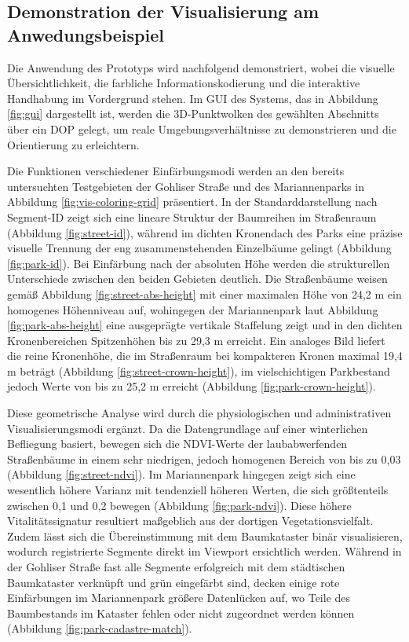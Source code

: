 \subsection{Demonstration der Visualisierung am Anwedungsbeispiel}

Die Anwendung des Prototyps wird nachfolgend demonstriert, wobei die visuelle Übersichtlichkeit, die farbliche Informationskodierung und die interaktive Handhabung im Vordergrund stehen. Im GUI des Systems, das in Abbildung \ref{fig:gui} dargestellt ist, werden die 3D-Punktwolken des gewählten Abschnitts über ein DOP gelegt, um reale Umgebungsverhältnisse zu demonstrieren und die Orientierung zu erleichtern.

Die Funktionen verschiedener Einfärbungsmodi werden an den bereits untersuchten Testgebieten der Gohliser Straße und des Mariannenparks in Abbildung \ref{fig:vis-coloring-grid} präsentiert. In der Standarddarstellung nach Segment-ID zeigt sich eine lineare Struktur der Baumreihen im Straßenraum (Abbildung \ref{fig:street-id}), während im dichten Kronendach des Parks eine präzise visuelle Trennung der eng zusammenstehenden Einzelbäume gelingt (Abbildung \ref{fig:park-id}). Bei Einfärbung nach der absoluten Höhe werden die strukturellen Unterschiede zwischen den beiden Gebieten deutlich. Die Straßenbäume weisen gemäß Abbildung \ref{fig:street-abs-height} mit einer maximalen Höhe von 24,2 m ein homogenes Höhenniveau auf, wohingegen der Mariannenpark laut Abbildung \ref{fig:park-abs-height} eine ausgeprägte vertikale Staffelung zeigt und in den dichten Kronenbereichen Spitzenhöhen bis zu 29,3 m erreicht. Ein analoges Bild liefert die reine Kronenhöhe, die im Straßenraum bei kompakteren Kronen maximal 19,4 m beträgt (Abbildung \ref{fig:street-crown-height}), im vielschichtigen Parkbestand jedoch Werte von bis zu 25,2 m erreicht (Abbildung \ref{fig:park-crown-height}).  

Diese geometrische Analyse wird durch die physiologischen und administrativen Visualisierungsmodi ergänzt. Da die Datengrundlage auf einer winterlichen Befliegung basiert, bewegen sich die NDVI-Werte der laubabwerfenden Straßenbäume in einem sehr niedrigen, jedoch homogenen Bereich von bis zu 0,03 (Abbildung \ref{fig:street-ndvi}). Im Mariannenpark hingegen zeigt sich eine wesentlich höhere Varianz mit tendenziell höheren Werten, die sich größtenteils zwischen 0,1 und 0,2 bewegen (Abbildung \ref{fig:park-ndvi}). Diese höhere Vitalitätssignatur resultiert maßgeblich aus der dortigen Vegetationsvielfalt. Zudem lässt sich die Übereinstimmung mit dem Baumkataster binär visualisieren, wodurch registrierte Segmente direkt im Viewport ersichtlich werden. Während in der Gohliser Straße fast alle Segmente erfolgreich mit dem städtischen Baumkataster verknüpft und grün eingefärbt sind, decken einige rote Einfärbungen im Mariannenpark größere Datenlücken auf, wo Teile des Baumbestands im Kataster fehlen oder nicht zugeordnet werden können (Abbildung \ref{fig:park-cadastre-match}).

